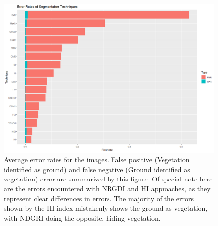 \documentclass[letterpaper]{report}
\begin{document}
{%
\begin{figure}[h]
	\centering
	\includegraphics[width=.75\linewidth]{figures/segmentation-error-rates.png}
	\caption[Error rates of segmentation algorithms]{Average error rates for the images. False positive (Vegetation identified as ground) and false negative (Ground identified as vegetation) error are summarized by this figure. Of special note here are the errors encountered with NRGDI and HI approaches, as they represent clear differences in errors. The majority of the errors shown by the HI index mistakenly shows the ground as vegetation, with NDGRI  doing the opposite, hiding vegetation.}
	\label{fig:segmentation-errors}
\end{figure}

}
\end{document}
